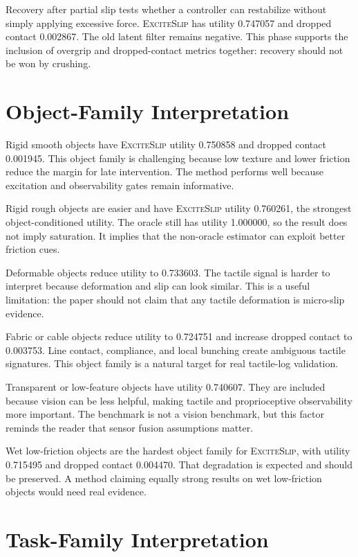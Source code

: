 \documentclass{article}
\newcommand{\method}{\textsc{ExciteSlip}\xspace}
\begin{document}
Recovery after partial slip tests whether a controller can restabilize without simply applying excessive force. \method has utility 0.747057 and dropped contact 0.002867. The old latent filter remains negative. This phase supports the inclusion of overgrip and dropped-contact metrics together: recovery should not be won by crushing.

\section{Object-Family Interpretation}

Rigid smooth objects have \method utility 0.750858 and dropped contact 0.001945. This object family is challenging because low texture and lower friction reduce the margin for late intervention. The method performs well because excitation and observability gates remain informative.

Rigid rough objects are easier and have \method utility 0.760261, the strongest object-conditioned utility. The oracle still has utility 1.000000, so the result does not imply saturation. It implies that the non-oracle estimator can exploit better friction cues.

Deformable objects reduce utility to 0.733603. The tactile signal is harder to interpret because deformation and slip can look similar. This is a useful limitation: the paper should not claim that any tactile deformation is micro-slip evidence.

Fabric or cable objects reduce utility to 0.724751 and increase dropped contact to 0.003753. Line contact, compliance, and local bunching create ambiguous tactile signatures. This object family is a natural target for real tactile-log validation.

Transparent or low-feature objects have utility 0.740607. They are included because vision can be less helpful, making tactile and proprioceptive observability more important. The benchmark is not a vision benchmark, but this factor reminds the reader that sensor fusion assumptions matter.

Wet low-friction objects are the hardest object family for \method, with utility 0.715495 and dropped contact 0.004470. That degradation is expected and should be preserved. A method claiming equally strong results on wet low-friction objects would need real evidence.

\section{Task-Family Interpretation}
\end{document}
